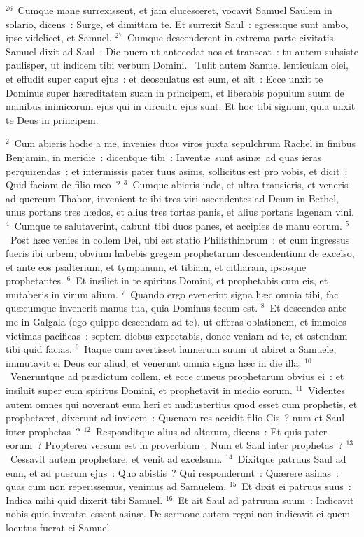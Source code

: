 ${}^{26}$~Cumque mane surrexissent, et jam elucesceret, vocavit Samuel Saulem in solario, dicens~: Surge, et dimittam te. Et surrexit Saul~: egressique sunt ambo, ipse videlicet, et Samuel.
${}^{27}$~Cumque descenderent in extrema parte civitatis, Samuel dixit ad Saul~: Dic puero ut antecedat nos et transeat~: tu autem subsiste paulisper, ut indicem tibi verbum Domini.
~\lettrine[lines=10,image=true,loversize=0.05,lraise=-0.03]{T}{}ulit autem Samuel lenticulam olei, et effudit super caput ejus~: et deosculatus est eum, et ait~: Ecce unxit te Dominus super h\ae reditatem suam in principem, et liberabis populum suum de manibus inimicorum ejus qui in circuitu ejus sunt. Et hoc tibi signum, quia unxit te Deus in principem.


${}^{2}$~Cum abieris hodie a me, invenies duos viros juxta sepulchrum Rachel in finibus Benjamin, in meridie~: dicentque tibi~: Invent\ae\ sunt asin\ae\ ad quas ieras perquirendas~: et intermissis pater tuus asinis, sollicitus est pro vobis, et dicit~: Quid faciam de filio meo~?
${}^{3}$~Cumque abieris inde, et ultra transieris, et veneris ad quercum Thabor, invenient te ibi tres viri ascendentes ad Deum in Bethel, unus portans tres h\ae dos, et alius tres tortas panis, et alius portans lagenam vini.
${}^{4}$~Cumque te salutaverint, dabunt tibi duos panes, et accipies de manu eorum.
${}^{5}$~Post h\ae c venies in collem Dei, ubi est statio Philisthinorum~: et cum ingressus fueris ibi urbem, obvium habebis gregem prophetarum descendentium de excelso, et ante eos psalterium, et tympanum, et tibiam, et citharam, ipsosque prophetantes.
${}^{6}$~Et insiliet in te spiritus Domini, et prophetabis cum eis, et mutaberis in virum alium.
${}^{7}$~Quando ergo evenerint signa h\ae c omnia tibi, fac qu\ae cumque invenerit manus tua, quia Dominus tecum est.
${}^{8}$~Et descendes ante me in Galgala (ego quippe descendam ad te), ut offeras oblationem, et immoles victimas pacificas~: septem diebus expectabis, donec veniam ad te, et ostendam tibi quid facias.
${}^{9}$~Itaque cum avertisset humerum suum ut abiret a Samuele, immutavit ei Deus cor aliud, et venerunt omnia signa h\ae c in die illa.
${}^{10}$~Veneruntque ad pr\ae dictum collem, et ecce cuneus prophetarum obvius ei~: et insiluit super eum spiritus Domini, et prophetavit in medio eorum.
${}^{11}$~Videntes autem omnes qui noverant eum heri et nudiustertius quod esset cum prophetis, et prophetaret, dixerunt ad invicem~: Qu\ae nam res accidit filio Cis~? num et Saul inter prophetas~?
${}^{12}$~Responditque alius ad alterum, dicens~: Et quis pater eorum~? Propterea versum est in proverbium~: Num et Saul inter prophetas~?
${}^{13}$~Cessavit autem prophetare, et venit ad excelsum.
${}^{14}$~Dixitque patruus Saul ad eum, et ad puerum ejus~: Quo abistis~? Qui responderunt~: Qu\ae rere asinas~: quas cum non reperissemus, venimus ad Samuelem.
${}^{15}$~Et dixit ei patruus suus~: Indica mihi quid dixerit tibi Samuel.
${}^{16}$~Et ait Saul ad patruum suum~: Indicavit nobis quia invent\ae\ essent asin\ae . De sermone autem regni non indicavit ei quem locutus fuerat ei Samuel.


